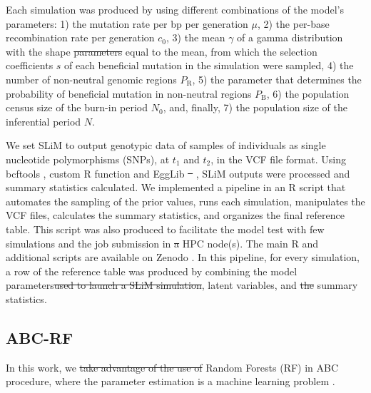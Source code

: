 \documentclass[a4paper, 12pt]{article}
\providecommand{\DIFaddtex}[1]{{\protect\color{blue}\uwave{#1}}} %
\providecommand{\DIFdeltex}[1]{{\protect\color{red}\sout{#1}}}                      %
\providecommand{\DIFaddbegin}{} %
\providecommand{\DIFaddend}{} %
\providecommand{\DIFdelbegin}{} %
\providecommand{\DIFdelend}{} %
\providecommand{\DIFadd}[1]{\texorpdfstring{\DIFaddtex{#1}}{#1}} %
\providecommand{\DIFdel}[1]{\texorpdfstring{\DIFdeltex{#1}}{}} %
\newcommand{\DIFscaledelfig}{0.5}
\newlength{\DIFdelgraphicswidth} %
\newlength{\DIFdelgraphicsheight} %
\newcommand{\DIFaddincludegraphics}[2][]{{\color{blue}\fbox{\DIFOincludegraphics[#1]{#2}}}} %
\newcommand{\DIFdelincludegraphics}[2][]{%
\sbox{\DIFdelgraphicsbox}{\DIFOincludegraphics[#1]{#2}}%
\settoboxwidth{\DIFdelgraphicswidth}{\DIFdelgraphicsbox} %
\settoboxtotalheight{\DIFdelgraphicsheight}{\DIFdelgraphicsbox} %
\scalebox{\DIFscaledelfig}{%
\parbox[b]{\DIFdelgraphicswidth}{\usebox{\DIFdelgraphicsbox}\\[-\baselineskip] \rule{\DIFdelgraphicswidth}{0em}}\llap{\resizebox{\DIFdelgraphicswidth}{\DIFdelgraphicsheight}{%
\setlength{\unitlength}{\DIFdelgraphicswidth}%
\begin{picture}(1,1)%
\thicklines\linethickness{2pt} %
{\color[rgb]{1,0,0}\put(0,0){\framebox(1,1){}}}%
{\color[rgb]{1,0,0}\put(0,0){\line( 1,1){1}}}%
{\color[rgb]{1,0,0}\put(0,1){\line(1,-1){1}}}%
\end{picture}%
}\hspace*{3pt}}} %
} %
\DeclareRobustCommand{\DIFaddbegin}{\DIFOaddbegin \let\includegraphics\DIFaddincludegraphics} %
\DeclareRobustCommand{\DIFaddend}{\DIFOaddend \let\includegraphics\DIFOincludegraphics} %
\DeclareRobustCommand{\DIFdelbegin}{\DIFOdelbegin \let\includegraphics\DIFdelincludegraphics} %
\DeclareRobustCommand{\DIFdelend}{\DIFOaddend \let\includegraphics\DIFOincludegraphics} %
\begin{document}
Each simulation was produced by using different combinations of the model's parameters: 1) the mutation rate per bp per generation $\mu$, 2) the per-base recombination rate per generation \DIFdelbegin \DIFdel{$c_{\mathrm{0}}$}\DIFdelend \DIFaddbegin \DIFadd{$r$}\DIFaddend , 3) the mean $\gamma$ of a gamma distribution \DIFaddbegin \DIFadd{(}\DIFaddend with the shape \DIFdelbegin \DIFdel{parameters }\DIFdelend \DIFaddbegin \DIFadd{parameter }\DIFaddend equal to the mean\DIFaddbegin \DIFadd{)}\DIFaddend , from which the selection coefficients $s$ of each beneficial mutation in the simulation were sampled, 4) the number of non-neutral genomic regions $P_\mathrm{R}$, 5) the parameter that determines the probability of beneficial mutation in non-neutral regions $P_\mathrm{B}$, 6) the population census size of the burn-in period $N_\mathrm{0}$, and, finally, 7) the population size of the inferential period $N$.

We set SLiM to output genotypic data of samples of individuals as single nucleotide polymorphisms (SNPs), at $t_1$ and $t_2$, in the VCF file format. Using bcftools \citep{Li:2011kr}, custom R function \citep{Rcore} and EggLib \DIFdelbegin \DIFdel{\mbox{%
\citep{DeMita:2012dx}}\hspace{0pt}%
}\DIFdelend \DIFaddbegin \DIFadd{\mbox{%
\citep{Siol2022}}\hspace{0pt}%
}\DIFaddend , SLiM outputs were processed and summary statistics calculated. We implemented a pipeline in an R script that automates the sampling of the prior values, runs each simulation, manipulates the VCF files, calculates the summary statistics, and organizes the final reference table. This script was also produced to facilitate the model test with \DIFaddbegin \DIFadd{a }\DIFaddend few simulations and the job submission in \DIFdelbegin \DIFdel{a }\DIFdelend \DIFaddbegin \DIFadd{an }\DIFaddend HPC node(s). The main R and additional scripts are available on Zenodo \citep{Pavinato:2021}. In this pipeline, for every simulation, a row of the reference table was produced by combining the model parameters\DIFdelbegin \DIFdel{used to launch a SLiM simulation}\DIFdelend , latent variables, and \DIFdelbegin \DIFdel{the }\DIFdelend summary statistics.

\subsection*{ABC-RF}

In this work, we \DIFdelbegin \DIFdel{take advantage of the use of }\DIFdelend \DIFaddbegin \DIFadd{use }\DIFaddend Random Forests (RF) in \DIFaddbegin \DIFadd{the }\DIFaddend ABC procedure, where the parameter estimation is a machine learning problem \citep{Pudlo:2016il, Raynal:2019jj}. \DIFdelbegin %
\end{document}
